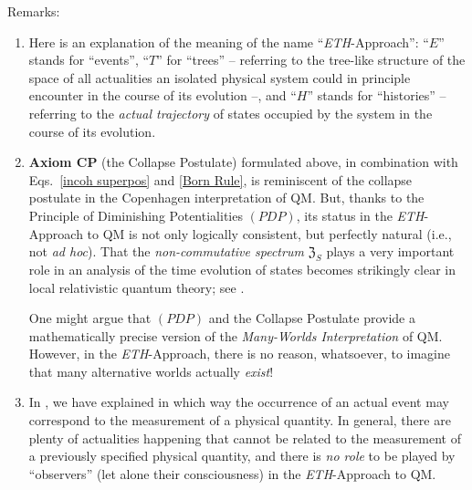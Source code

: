 \documentclass[12pt]{article}
\begin{document}
{Remarks}:
\begin{enumerate}
\item{Here is an explanation of the meaning of the name ``\textit{ETH}-Approach'': ``$E$'' stands for ``events'', 
``$T$'' for ``trees'' -- referring to the tree-like structure of the space of all actualities an isolated physical system 
could in principle encounter in the course of its evolution --, and ``$H$'' stands for ``histories'' -- 
referring to the \textit{actual trajectory} of states occupied by the system in the course of its evolution.}
\item{{\bf{Axiom CP}} (the Collapse Postulate) formulated above, in combination with Eqs.~\eqref{incoh superpos} 
and \eqref{Born Rule}, is reminiscent of the collapse postulate in the Copenhagen interpretation of QM. But, thanks to the 
Principle of Diminishing Potentialities $(PDP)$, its status in the \textit{ETH}-Approach to QM is not only logically consistent, but perfectly natural (i.e., not \textit{ad hoc}). That the \textit{non-commutative spectrum} $\mathfrak{Z}_S$ plays a very important role in an analysis of the time evolution of states becomes strikingly clear in local relativistic quantum theory; see \cite{Fr2}.

One might argue that  $(PDP)$ and the Collapse Postulate provide a mathematically precise version of the 
\textit{Many-Worlds Interpretation} of QM. However, in the \textit{ETH}-Approach, there is no reason, whatsoever, to 
imagine that many alternative worlds actually \textit{exist}!}
\item{In \cite{Fr1, Fr2}, we have explained in which way the occurrence of an actual event may correspond 
to the measurement of a physical quantity. In general, there are plenty of actualities happening that cannot be related 
to the measurement of a previously specified physical quantity, and there is \textit{no role} to be played by ``observers'' (let alone their consciousness) in the 
\textit{ETH}-Approach to QM.

}
\end{enumerate}
\end{document}
